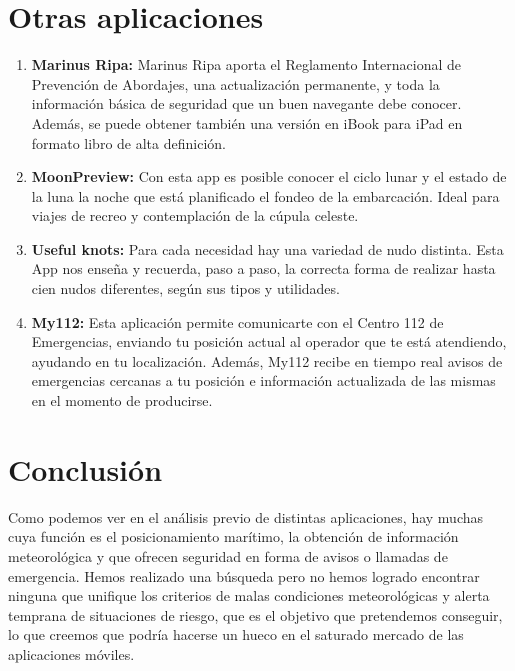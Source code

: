 \section{Otras aplicaciones}
\begin{enumerate}

\item \textbf{Marinus Ripa:} Marinus Ripa aporta el Reglamento
  Internacional de Prevención de Abordajes, una actualización
  permanente, y toda la información básica de seguridad que un buen
  navegante debe conocer. Además, se puede obtener también una versión
  en iBook para iPad en formato libro de alta definición.

\item \textbf{MoonPreview:} Con esta app es posible conocer el ciclo
  lunar y el estado de la luna la noche que está planificado el fondeo
  de la embarcación. Ideal para viajes de recreo y contemplación de la
  cúpula celeste.

\item \textbf{Useful knots:} Para cada necesidad hay una variedad de
  nudo distinta. Esta App nos enseña y recuerda, paso a paso, la
  correcta forma de realizar hasta cien nudos diferentes, según sus
  tipos y utilidades.

\item \textbf{My112:} Esta aplicación permite comunicarte con el
  Centro 112 de Emergencias, enviando tu posición actual al operador
  que te está atendiendo, ayudando en tu localización. Además, My112
  recibe en tiempo real avisos de emergencias cercanas a tu posición e
  información actualizada de las mismas en el momento de producirse.
\end{enumerate}

\section{Conclusión}

Como podemos ver en el análisis previo de distintas aplicaciones, hay
muchas cuya función es el posicionamiento marítimo, la obtención de
información meteorológica y que ofrecen seguridad en forma de avisos o
llamadas de emergencia. Hemos realizado una búsqueda pero no hemos
logrado encontrar ninguna que unifique los criterios de malas
condiciones meteorológicas y alerta temprana de situaciones de riesgo,
que es el objetivo que pretendemos conseguir, lo que creemos que
podría hacerse un hueco en el saturado mercado de las aplicaciones
móviles.
